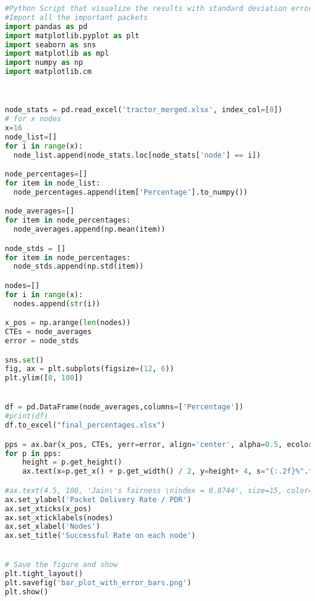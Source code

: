 \newpage
\begin{lstlisting}[language=Python, caption = Python Script that visualize the results with standard deviation error bars, label=lst:ploteachnode]
#Python Script that visualize the results with standard deviation error bars.
#Import all the important packets
import pandas as pd 
import matplotlib.pyplot as plt 
import seaborn as sns
import matplotlib as mpl
import numpy as np
import matplotlib.cm


 
node_stats = pd.read_excel('tractor_merged.xlsx', index_col=[0])
# for x nodes
x=16
node_list=[]
for i in range(x):
  node_list.append(node_stats.loc[node_stats['node'] == i])

node_percentages=[]
for item in node_list:
  node_percentages.append(item['Percentage'].to_numpy())

node_averages=[]
for item in node_percentages:
  node_averages.append(np.mean(item))

node_stds = []
for item in node_percentages:
  node_stds.append(np.std(item))

nodes=[]
for i in range(x):
  nodes.append(str(i))

x_pos = np.arange(len(nodes))
CTEs = node_averages
error = node_stds

sns.set()
fig, ax = plt.subplots(figsize=(12, 6))
plt.ylim([0, 100])


df = pd.DataFrame(node_averages,columns=['Percentage'])
#print(df)
df.to_excel("final_percentages.xlsx")                    

pps = ax.bar(x_pos, CTEs, yerr=error, align='center', alpha=0.5, ecolor='maroon', capsize=10, width = 0.5)
for p in pps:
    height = p.get_height()
    ax.text(x=p.get_x() + p.get_width() / 2, y=height+ 4, s="{:.2f}%".format(height), ha='center',  weight='bold')

#ax.text(4.5, 100, 'Jain\'s fairness \nindex = 0.8744', size=15, color='purple')    
ax.set_ylabel('Packet Delivery Rate / PDR')
ax.set_xticks(x_pos)
ax.set_xticklabels(nodes)
ax.set_xlabel('Nodes')
ax.set_title('Successful Rate on each node')


# Save the figure and show
plt.tight_layout()
plt.savefig('bar_plot_with_error_bars.png')
plt.show()
 
\end{lstlisting}

